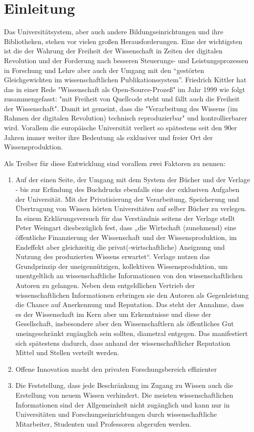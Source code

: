 \chapter{Einleitung} 
Das Universitätsystem, aber auch andere Bildungseinrichtungen und ihre Bibliotheken, stehen vor vielen großen Herausforderungen. Eine der wichtigsten ist die der Wahrung der Freiheit der Wissenschaft in Zeiten der digitalen Revolution und der Forderung nach besseren Steuerungs- und Leistungsprozessen in Forschung und Lehre aber auch der Umgang mit den “gestörten Gleichgewichten im wissenschaftlichen Publikationssystem”\cite{cite:0}. Friedrich Kittler hat das in einer Rede "Wissenschaft als Open-Source-Prozeß" im Jahr 1999 wie folgt zusammengefasst: "mit Freiheit von Quellcode steht und fällt auch die Freiheit der Wissenschaft". Damit ist gemeint, dass die "Verarbeitung des Wissens (im Rahmen der digitalen Revolution) technisch reproduzierbar"\cite{cite:1} und kontrollierbarer wird. Vorallem die europäische Universität verliert so spätestens seit den 90er Jahren immer weiter ihre Bedeutung als exklusiver und freier Ort der Wissensproduktion.

Als Treiber für diese Entwicklung sind vorallem zwei Faktoren zu nennen: 
\begin{enumerate}
\item Auf der einen Seite, der Umgang mit dem System der Bücher und der Verlage - bis zur Erfindung des Buchdrucks ebenfalls eine der exklusiven Aufgaben der Universität. Mit der Privatisierung der Verarbeitung, Speicherung und Übertragung von Wissen hörten Universitäten auf selber Bücher zu verlegen. In einem Erklärungsversuch für das Verständnis seitens der Verlage stellt Peter Weingart diesbezüglich fest, dass „die Wirtschaft (zunehmend) eine öffentliche Finanzierung der Wissenschaft und der Wissensproduktion, im Endeffekt aber gleichzeitig die privat(-wirtschaftliche) Aneignung und Nutzung des produzierten Wissens erwartet“\cite{cite:2}. Verlage nutzen das Grundprinzip der uneigennützigen, kollektiven Wissensproduktion, um unentgeltlich an wissenschaftliche Informationen von den wissenschaftlichen Autoren zu gelangen. Neben dem entgeldlichen Vertrieb der wissenschaftlichen Informationen erbringen sie den Autoren als Gegenleistung die Chance auf Anerkennung und Reputation. Das steht der Annahme, dass es der Wissenschaft im Kern aber um Erkenntnisse und diese der Gesellschaft, insbesondere aber den Wissenschaftlern als öffentliches Gut uneingeschränkt zugänglich sein sollten\cite{cite:3}, diametral entgegen. Das manifestiert sich spätestens dadurch, dass anhand der wissenschaftlicher Reputation Mittel und Stellen verteilt werden\cite{cite:4}.
\item Offene Innovation macht den privaten Forschungsbereich effizienter
\item Die Feststellung, dass jede Beschränkung im Zugang zu Wissen auch die Erstellung von neuem Wissen verhindert\cite{cite:5}.  Die meisten wissenschaftlichen Informationen sind der Allgemeinheit nicht zugänglich und kann nur in Universitäten und Forschungseinrichtungen durch wissenschaftliche Mitarbeiter, Studenten und Professoren abgerufen werden\cite{cite:6}. 
\end{enumerate}	

